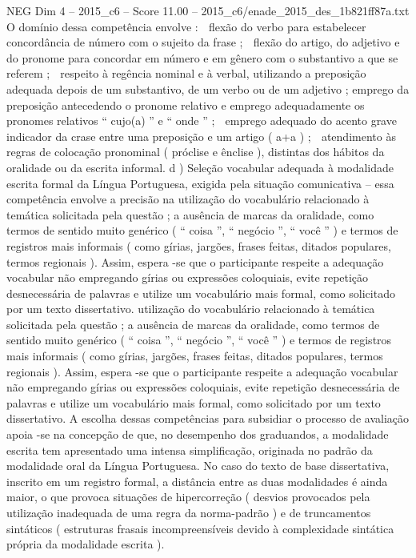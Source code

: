 \begin{textsample}{NEG Dim 4 – 2015\_c6 – Score 11.00 – 2015\_c6/enade\_2015\_des\_1b821ff87a.txt}
O domínio dessa competência envolve :  flexão do verbo para estabelecer concordância de número com o sujeito da frase ;  flexão do artigo, do adjetivo e do pronome para concordar em número e em gênero com o substantivo a que se referem ;  respeito à regência nominal e à verbal, utilizando a preposição adequada depois de um substantivo, de um verbo ou de um adjetivo ; emprego da preposição antecedendo o pronome relativo e emprego adequadamente os pronomes relativos “ cujo(a) ” e “ onde ” ;  emprego adequado do acento grave indicador da crase entre uma preposição e um artigo ( a+a ) ;  atendimento às regras de colocação pronominal ( próclise e ênclise ), distintas dos hábitos da oralidade ou da escrita informal. d ) Seleção vocabular adequada à modalidade escrita formal da Língua Portuguesa, exigida pela situação comunicativa – essa competência envolve a precisão na utilização do vocabulário relacionado à temática solicitada pela questão ; a ausência de marcas da oralidade, como termos de sentido muito genérico ( “ coisa ”, “ negócio ”, “ você ” ) e termos de registros mais informais ( como gírias, jargões, frases feitas, ditados populares, termos regionais ).
Assim, espera -se que o participante respeite a adequação vocabular não empregando gírias ou expressões coloquiais, evite repetição desnecessária de palavras e utilize um vocabulário mais formal, como solicitado por um texto dissertativo. utilização do vocabulário relacionado à temática solicitada pela questão ; a ausência de marcas da oralidade, como termos de sentido muito genérico ( “ coisa ”, “ negócio ”, “ você ” ) e termos de registros mais informais ( como gírias, jargões, frases feitas, ditados populares, termos regionais ).
Assim, espera -se que o participante respeite a adequação vocabular não empregando gírias ou expressões coloquiais, evite repetição desnecessária de palavras e utilize um vocabulário mais formal, como solicitado por um texto dissertativo.
A escolha dessas competências para subsidiar o processo de avaliação apoia -se na concepção de que, no desempenho dos graduandos, a modalidade escrita tem apresentado uma intensa simplificação, originada no padrão da modalidade oral da Língua Portuguesa.
No caso do texto de base dissertativa, inscrito em um registro formal, a distância entre as duas modalidades é ainda maior, o que provoca situações de hipercorreção ( desvios provocados pela utilização inadequada de uma regra da norma-padrão ) e de truncamentos sintáticos ( estruturas frasais incompreensíveis devido à complexidade sintática própria da modalidade escrita ).

\end{textsample}

